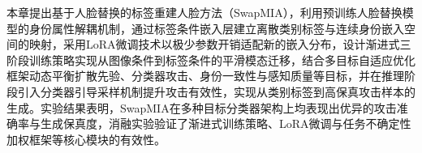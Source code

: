 本章提出基于人脸替换的标签重建人脸方法（SwapMIA），利用预训练人脸替换模型的身份属性解耦机制，通过标签条件嵌入层建立离散类别标签与连续身份嵌入空间的映射，采用LoRA微调技术以极少参数开销适配新的嵌入分布，设计渐进式三阶段训练策略实现从图像条件到标签条件的平滑模态迁移，结合多目标自适应优化框架动态平衡扩散先验、分类器攻击、身份一致性与感知质量等目标，并在推理阶段引入分类器引导采样机制提升攻击有效性，实现从类别标签到高保真攻击样本的生成。实验结果表明，SwapMIA在多种目标分类器架构上均表现出优异的攻击准确率与生成保真度，消融实验验证了渐进式训练策略、LoRA微调与任务不确定性加权框架等核心模块的有效性。
